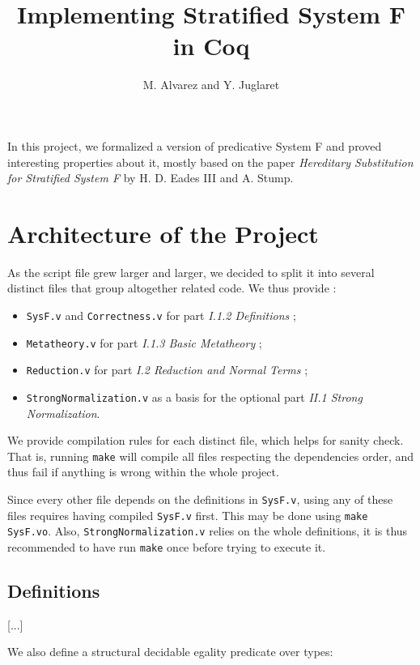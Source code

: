 \documentclass[a4paper,11pt]{article}
\begin{document}
\title{Implementing Stratified System F in Coq}
\author{M. Alvarez and Y. Juglaret}
\date{}
\maketitle

In this project, we formalized a version of predicative System F and
proved interesting properties about it, mostly based on the paper
\emph{Hereditary Substitution for Stratified System F} by H. D. Eades
III and A. Stump.

\section{Architecture of the Project}

As the script file grew larger and larger, we decided to split it into
several distinct files that group altogether related code. We thus
provide :

\begin{itemize}
  \item \verb|SysF.v| and \verb|Correctness.v| for part \emph{I.1.2
    Definitions} ;
  \item \verb|Metatheory.v| for part \emph{I.1.3 Basic Metatheory} ;
  \item \verb|Reduction.v| for part \emph{I.2 Reduction and Normal
    Terms} ;
  \item \verb|StrongNormalization.v| as a basis for the optional
    part \emph{II.1 Strong Normalization}.
\end{itemize}

We provide compilation rules for each distinct file, which helps
for sanity check. That is, running \verb|make| will compile all files
respecting the dependencies order, and thus fail if anything is wrong
within the whole project.

Since every other file depends on the definitions in \verb|SysF.v|,
using any of these files requires having compiled \verb|SysF.v|
first. This may be done using \verb|make SysF.vo|. Also,
\verb|StrongNormalization.v| relies on the whole definitions, it is
thus recommended to have run \verb|make| once before trying to execute
it.

\subsection{Definitions}

[...]

We also define a structural decidable egality predicate over types:
\end{document}
